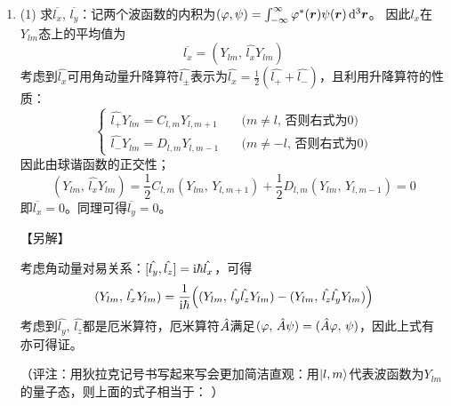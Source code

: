 \begin{enumerate}[label=2.\arabic*, leftmargin=-0.5mm]
\item
(1) 求$\overline{l_x}$, $\overline{l_y}$：记两个波函数的内积为$(\varphi, \psi) = \int_{-\infty}^\infty \varphi^*(\boldsymbol{r})\psi(\boldsymbol{r}) \dd[3]{\boldsymbol{r}}$。
因此$l_x$在$Y_{lm}$态上的平均值为
\[\overline{l_x} = (Y_{lm},\,\hat{l_x}Y_{lm})\]
考虑到$\hat{l_x}$可用角动量升降算符$\hat{l_\pm}$表示为$\hat{l_x}=\frac{1}{2}(\hat{l_+}+\hat{l_-})$，且利用升降算符的性质：
\[\begin{cases}
\hat{l_+}Y_{lm} = C_{l,m}Y_{l,m+1}\quad&\text{($m\neq l$, 否则右式为0)}\\
\hat{l_-}Y_{lm} = D_{l,m}Y_{l,m-1}\quad&\text{($m\neq -l$, 否则右式为0)}
\end{cases}
\]
因此由球谐函数的正交性；
\[(Y_{lm},\,\hat{l_x}Y_{lm}) = \frac{1}{2}C_{l,m}(Y_{lm},\,Y_{l,m+1})+\frac{1}{2} D_{l,m}(Y_{lm},\,Y_{l,m-1})=0\]
即$\overline{l_x}=0$。同理可得$\overline{l_y}=0$。

【另解】

考虑角动量对易关系：$[\hat{l_y},\hat{l_z}]=\mathrm{i}\hbar \hat{l_x}$，可得
\[(Y_{lm},\,\hat{l_x}Y_{lm}) =\frac{1}{\mathrm{i}\hbar}\qty((Y_{lm},\,\hat{l_y}\hat{l_z}Y_{lm})-(Y_{lm},\,\hat{l_z}\hat{l_y}Y_{lm}))\]
考虑到$\hat{l_y}$, $\hat{l_z}$都是厄米算符，厄米算符$\hat{A}$满足$(\varphi,\,\hat{A}\psi)=(\hat{A}\varphi,\,\psi)$，因此上式有
亦可得证。

（评注：用狄拉克记号书写起来写会更加简洁直观：用$\ket{l,m}$代表波函数为$Y_{lm}$的量子态，则上面的式子相当于：
）


\end{enumerate}
